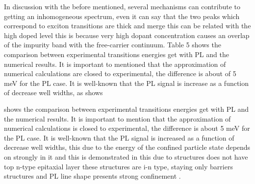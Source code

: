 In discussion with the before mentioned, several mechanisms can contribute to getting an inhomogeneous spectrum, even it can say that the two peaks which correspond to exciton transitions are thick and merge this can be related with the high doped level this is because very high dopant concentration causes an overlap of the impurity band with the free-carrier continuum\cite{kundrotas2005excitonic}. Table 5 shows the comparison between experimental transitions energies get with PL and the numerical results. It is important to mentioned that the approximation of numerical calculations are closed to experimental, the difference  is about of 5 meV for the PL case. It is well-known that the PL signal is increase as a function of decrease well widths, as shows 


 shows the comparison between experimental transitions energies get with PL and the numerical results. It is important to mention that the approximation of numerical calculations is closed to experimental, the difference is about 5 meV for the PL case. It is well-known that the PL signal is increased as a function of decrease well widths, this due to the energy of the confined particle state depends on strongly in it and this is demonstrated in  this due to structures does not have top n-type epitaxial layer these structures are i-n type, staying only barriers structures and PL line shape presents strong confinement \cite{singh1984theory,juang1986field,maluenda1983abrupttransitions}.



